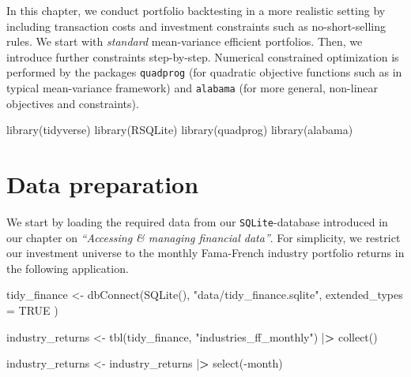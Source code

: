 \documentclass[
]{book}
\newenvironment{Shaded}{\begin{snugshade}}{\end{snugshade}}
\newcommand{\AttributeTok}[1]{\textcolor[rgb]{0.61,0.61,0.61}{#1}}
\newcommand{\ConstantTok}[1]{\textcolor[rgb]{0,0,0}{#1}}
\newcommand{\ErrorTok}[1]{\textcolor[rgb]{0.14,0.14,0.14}{\textbf{#1}}}
\newcommand{\FunctionTok}[1]{\textcolor[rgb]{0,0,0}{#1}}
\newcommand{\NormalTok}[1]{#1}
\newcommand{\OtherTok}[1]{\textcolor[rgb]{0.37,0.37,0.37}{#1}}
\newcommand{\SpecialCharTok}[1]{\textcolor[rgb]{0,0,0}{#1}}
\newcommand{\StringTok}[1]{\textcolor[rgb]{0.5,0.5,0.5}{#1}}
\begin{document}
In this chapter, we conduct portfolio backtesting in a more realistic setting by including transaction costs and investment constraints such as no-short-selling rules. We start with \emph{standard} mean-variance efficient portfolios. Then, we introduce further constraints step-by-step. Numerical constrained optimization is performed by the packages \texttt{quadprog} (for quadratic objective functions such as in typical mean-variance framework) and \texttt{alabama} (for more general, non-linear objectives and constraints).

\begin{Shaded}
\begin{Highlighting}[]
\FunctionTok{library}\NormalTok{(tidyverse)}
\FunctionTok{library}\NormalTok{(RSQLite)}
\FunctionTok{library}\NormalTok{(quadprog)}
\FunctionTok{library}\NormalTok{(alabama)}
\end{Highlighting}
\end{Shaded}

\hypertarget{data-preparation-7}{%
\section{Data preparation}\label{data-preparation-7}}

We start by loading the required data from our \texttt{SQLite}-database introduced in our chapter on \emph{``Accessing \& managing financial data''}. For simplicity, we restrict our investment universe to the monthly Fama-French industry portfolio returns in the following application.

\begin{Shaded}
\begin{Highlighting}[]
\NormalTok{tidy\_finance }\OtherTok{\textless{}{-}} \FunctionTok{dbConnect}\NormalTok{(}\FunctionTok{SQLite}\NormalTok{(), }\StringTok{"data/tidy\_finance.sqlite"}\NormalTok{,}
  \AttributeTok{extended\_types =} \ConstantTok{TRUE}
\NormalTok{)}

\NormalTok{industry\_returns }\OtherTok{\textless{}{-}} \FunctionTok{tbl}\NormalTok{(tidy\_finance, }\StringTok{"industries\_ff\_monthly"}\NormalTok{) }\SpecialCharTok{|}\ErrorTok{\textgreater{}}
  \FunctionTok{collect}\NormalTok{()}

\NormalTok{industry\_returns }\OtherTok{\textless{}{-}}\NormalTok{ industry\_returns }\SpecialCharTok{|}\ErrorTok{\textgreater{}}
  \FunctionTok{select}\NormalTok{(}\SpecialCharTok{{-}}\NormalTok{month)}
\end{Highlighting}
\end{Shaded}
\end{document}
